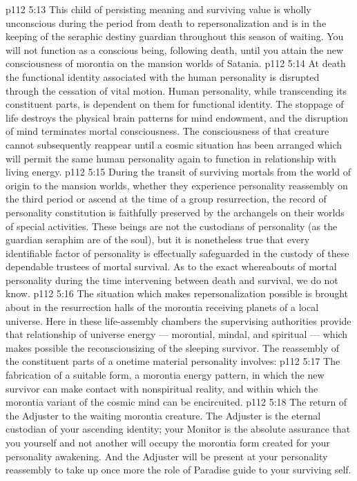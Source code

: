 \vs p112 5:13 This child of persisting meaning and surviving value is wholly unconscious during the period from death to repersonalization and is in the keeping of the seraphic destiny guardian throughout this season of waiting. You will not function as a conscious being, following death, until you attain the new consciousness of morontia on the mansion worlds of Satania.
\vs p112 5:14 At death the functional identity associated with the human personality is disrupted through the cessation of vital motion. Human personality, while transcending its constituent parts, is dependent on them for functional identity. The stoppage of life destroys the physical brain patterns for mind endowment, and the disruption of mind terminates mortal consciousness. The consciousness of that creature cannot subsequently reappear until a cosmic situation has been arranged which will permit the same human personality again to function in relationship with living energy.
\vs p112 5:15 \pc During the transit of surviving mortals from the world of origin to the mansion worlds, whether they experience personality reassembly on the third period or ascend at the time of a group resurrection, the record of personality constitution is faithfully preserved by the archangels on their worlds of special activities. These beings are not the custodians of personality (as the guardian seraphim are of the soul), but it is nonetheless true that every identifiable factor of personality is effectually safeguarded in the custody of these dependable trustees of mortal survival. As to the exact whereabouts of mortal personality during the time intervening between death and survival, we do not know.
\vs p112 5:16 \pc The situation which makes repersonalization possible is brought about in the resurrection halls of the morontia receiving planets of a local universe. Here in these life\hyp{}assembly chambers the supervising authorities provide that relationship of universe energy --- morontial, mindal, and spiritual --- which makes possible the reconsciousizing of the sleeping survivor. The reassembly of the constituent parts of a onetime material personality involves:
\vs p112 5:17 \bibnobreakspace The fabrication of a suitable form, a morontia energy pattern, in which the new survivor can make contact with nonspiritual reality, and within which the morontia variant of the cosmic mind can be encircuited.
\vs p112 5:18 \bibnobreakspace The return of the Adjuster to the waiting morontia creature. The Adjuster is the eternal custodian of your ascending identity; your Monitor is the absolute assurance that you yourself and not another will occupy the morontia form created for your personality awakening. And the Adjuster will be present at your personality reassembly to take up once more the role of Paradise guide to your surviving self.
